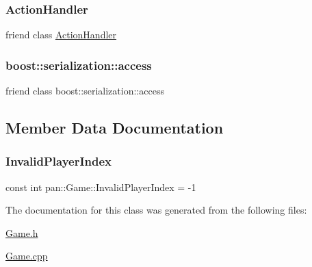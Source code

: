 \subsubsection{\texorpdfstring{Action\+Handler}{ActionHandler}}
{\footnotesize\ttfamily friend class \hyperlink{classpan_1_1_action_handler}{Action\+Handler}\hspace{0.3cm}{\ttfamily [friend]}}

\mbox{\label{classpan_1_1_game_ac98d07dd8f7b70e16ccb9a01abf56b9c}} 
\subsubsection{\texorpdfstring{boost\+::serialization\+::access}{boost::serialization::access}}
{\footnotesize\ttfamily friend class boost\+::serialization\+::access\hspace{0.3cm}{\ttfamily [friend]}}



\subsection{Member Data Documentation}
\mbox{\label{classpan_1_1_game_ade098455080cd39281e873a499331139}} 
\subsubsection{\texorpdfstring{Invalid\+Player\+Index}{InvalidPlayerIndex}}
{\footnotesize\ttfamily const int pan\+::\+Game\+::\+Invalid\+Player\+Index = -\/1\hspace{0.3cm}{\ttfamily [static]}}



The documentation for this class was generated from the following files\+:\begin{DoxyCompactItemize}
\item 
\hyperlink{_game_8h}{Game.\+h}\item 
\hyperlink{_game_8cpp}{Game.\+cpp}\end{DoxyCompactItemize}
